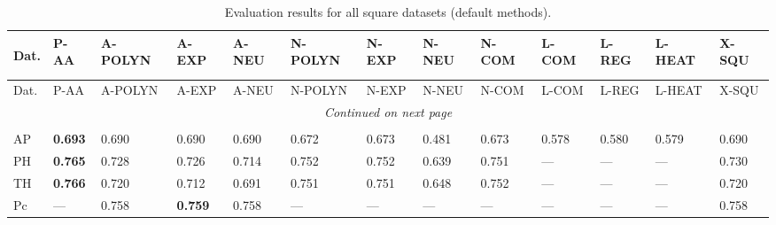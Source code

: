 
\begin{longtable}{ lllllllllllll }

\caption[Evaluation results for all square datasets (default methods)]{Evaluation results for all square datasets (default methods).}  \\


\label{results-all-square1}

Dat.                   & P-AA  & A-POLYN & A-EXP & A-NEU & N-POLYN & N-EXP & N-NEU & N-COM & L-COM & L-REG & L-HEAT & X-SQU \\ 
\hline

\endfirsthead


\hline
Dat.                   & P-AA  & A-POLYN & A-EXP & A-NEU & N-POLYN & N-EXP & N-NEU & N-COM & L-COM & L-REG & L-HEAT & X-SQU \\ 
\hline

\endhead

\hline
\multicolumn{13}{c}{\textit{Continued on next page}} \\* 
\hline

\endfoot

\hline \hline
\endlastfoot

\hline
\multicolumn{13}{|l|}{\textbf{Authorship}} \\
\hline
\textsf{AP}                   & \bf{0.693} & 0.690 & 0.690 & 0.690 & 0.672 & 0.673 & 0.481 & 0.673 & 0.578 & 0.580 & 0.579 & 0.690 \\
\textsf{PH}                   & \bf{0.765} & 0.728 & 0.726 & 0.714 & 0.752 & 0.752 & 0.639 & 0.751 & --- & --- & --- & 0.730 \\
\textsf{TH}                   & \bf{0.766} & 0.720 & 0.712 & 0.691 & 0.751 & 0.751 & 0.648 & 0.752 & --- & --- & --- & 0.720 \\
\textsf{Pc}                   & --- & 0.758 & \bf{0.759} & 0.758 & --- & --- & --- & --- & --- & --- & --- & 0.758 \\


\end{longtable}
